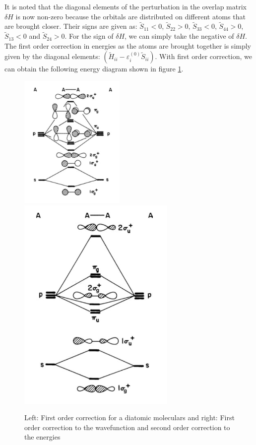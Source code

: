 \documentclass{article}
\newcommand{\order}[2]{#1^{(#2)}}
\begin{document}
It is noted that the diagonal elements of the perturbation in the overlap matrix 
$\delta H$ is now non-zero because the orbitals are distributed on different atoms 
that are brought closer. Their signs are given as:
$\tilde{S}_{11} < 0$, 
$\tilde{S}_{22} > 0$, 
$\tilde{S}_{33} < 0$, 
$\tilde{S}_{44} > 0$, 
$\tilde{S}_{13} < 0$ and 
$\tilde{S}_{24} > 0$. For the sign of $\delta H$, we can simply take the negative 
of $\delta H$. The first order correction in energies as the atoms are brought together 
is simply given by the diagonal elements: 
$(\tilde{H}_{ii} - \order{\varepsilon_i}{0} \tilde{S}_{ii})$. With first order correction, 
we can obtain the following energy diagram shown in figure \ref{F:A2_first_order}.
\begin{figure}[h!]
    \centering
    \includegraphics[width=2in]{figures/F_A2_first_order.png}
    \includegraphics[width=3in]{figures/F_A2_second_order.png}
    \caption{Left: First order correction for a diatomic moleculars and 
             right: First order correction to the wavefunction and second order correction to the energies}
    \label{F:A2_first_order}
\end{figure}
\end{document}
